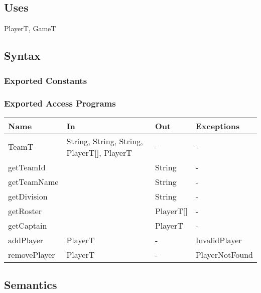 \documentclass[12pt, titlepage]{article}
\begin{document}
\begin{itemize}
\subsection{Uses}
PlayerT, GameT

\subsection{Syntax}

\subsubsection{Exported Constants}

\subsubsection{Exported Access Programs}

\begin{center}
  \begin{tabular}{|p{4cm}| p{4cm}| p{4cm} | p{3cm}|}
    \hline
    \textbf{Name} & \textbf{In}                                & \textbf{Out} & \textbf{Exceptions} \\
    \hline
    TeamT         & String, String, String, PlayerT[], PlayerT & -            & -                   \\
    getTeamId     &                                            & String       & -                   \\
    getTeamName   &                                            & String       & -                   \\
    getDivision   &                                            & String       & -                   \\
    getRoster     &                                            & PlayerT[]    & -                   \\
    getCaptain    &                                            & PlayerT      & -                   \\
    addPlayer     & PlayerT                                    & -            & InvalidPlayer       \\
    removePlayer  & PlayerT                                    & -            & PlayerNotFound      \\
    \hline
  \end{tabular}
\end{center}

\subsection{Semantics}


\end{itemize}
\end{document}
